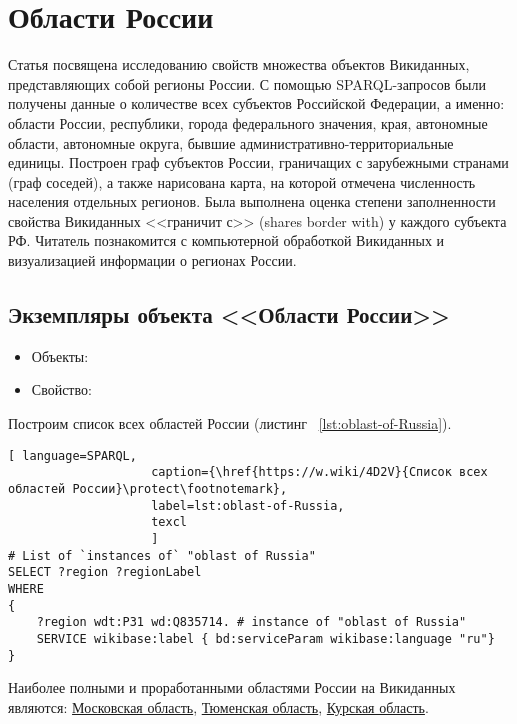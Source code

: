 ﻿\chapter{Области России}
\label{ch:oblast-of-Russia}
Статья посвящена исследованию свойств множества объектов Викиданных, 
представляющих собой регионы России. С помощью SPARQL-запросов были получены 
данные о количестве всех субъектов Российской Федерации, а именно: области России, 
республики, города федерального значения, края, автономные области, автономные округа, 
бывшие административно-территориальные единицы. Построен граф субъектов России, граничащих 
с зарубежными странами (граф соседей), а также нарисована карта, на которой отмечена численность 
населения отдельных регионов. Была выполнена оценка степени заполненности свойства Викиданных 
<<граничит с>> (shares border with) у каждого субъекта РФ. Читатель познакомится с компьютерной 
обработкой Викиданных и визуализацией информации о регионах России.

\section{Экземпляры объекта <<Области России>>}

\begin{itemize}
  \item Объекты: 
  \item Свойство: 
\end{itemize}

Построим список всех областей России (листинг ~\protect\ref{lst:oblast-of-Russia}).

\begin{lstlisting}[ language=SPARQL, 
                    caption={\href{https://w.wiki/4D2V}{Список всех областей России}\protect\footnotemark},
                    label=lst:oblast-of-Russia,
                    texcl 
                    ]
# List of `instances of` "oblast of Russia"
SELECT ?region ?regionLabel
WHERE
{
    ?region wdt:P31 wd:Q835714. # instance of "oblast of Russia"
    SERVICE wikibase:label { bd:serviceParam wikibase:language "ru"}
}
\end{lstlisting}%

Наиболее полными и проработанными областями России на Викиданных являются: \href{https://www.wikidata.org/wiki/Q1697}{Московская область}, \href{https://www.wikidata.org/wiki/Q5824}{Тюменская область}, \href{https://www.wikidata.org/wiki/Q3178}{Курская область}.

